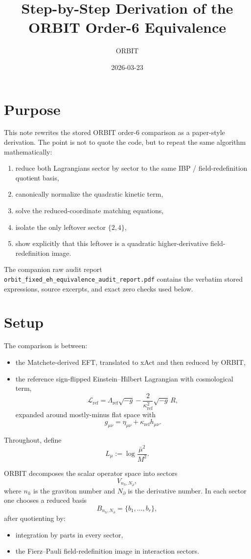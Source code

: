 \documentclass[11pt]{article}
\title{Step-by-Step Derivation of the ORBIT Order-6 Equivalence}
\author{ORBIT}
\date{2026-03-23}
\newcommand{\Lmu}{L_\mu}
\begin{document}
\maketitle
\tableofcontents

\section{Purpose}

This note rewrites the stored ORBIT order-6 comparison as a paper-style derivation. The point is not to quote the code, but to repeat the same algorithm mathematically:
\begin{enumerate}
\item reduce both Lagrangians sector by sector to the same IBP / field-redefinition quotient basis,
\item canonically normalize the quadratic kinetic term,
\item solve the reduced-coordinate matching equations,
\item isolate the only leftover sector $\{2,4\}$,
\item show explicitly that this leftover is a quadratic higher-derivative field-redefinition image.
\end{enumerate}

The companion raw audit report
\texttt{orbit\_fixed\_eh\_equivalence\_audit\_report.pdf}
contains the verbatim stored expressions, source excerpts, and exact zero checks used below.

\section{Setup}

The comparison is between:
\begin{itemize}
\item the Matchete-derived EFT, translated to xAct and then reduced by ORBIT,
\item the reference sign-flipped Einstein--Hilbert Lagrangian with cosmological term,
\[
\mathcal{L}_{\mathrm{ref}}
=
\Lambda_{\mathrm{ref}}\sqrt{-g}
-\frac{2}{\kappa_{\mathrm{ref}}^2}\sqrt{-g}\,R,
\]
expanded around mostly-minus flat space with
\[
g_{\mu\nu}=\eta_{\mu\nu}+\kappa_{\mathrm{ref}} h_{\mu\nu}.
\]
\end{itemize}

Throughout, define
\[
\Lmu := \log\!\frac{\bar\mu^2}{M^2}.
\]

ORBIT decomposes the scalar operator space into sectors
\[
V_{n_h,N_\partial},
\]
where $n_h$ is the graviton number and $N_\partial$ is the derivative number. In each sector one chooses a reduced basis
\[
B_{n_h,N_\partial}=\{b_1,\dots,b_r\},
\]
after quotienting by:
\begin{itemize}
\item integration by parts in every sector,
\item the Fierz--Pauli field-redefinition image in interaction sectors.
\end{itemize}
\end{document}
